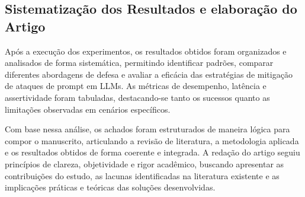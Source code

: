 \subsection{Sistematização dos Resultados e elaboração do Artigo}

Após a execução dos experimentos, os resultados obtidos foram organizados e analisados de forma sistemática, permitindo identificar padrões, comparar diferentes abordagens de defesa e avaliar a eficácia das estratégias de mitigação de ataques de prompt em LLMs. As métricas de desempenho, latência e assertividade foram tabuladas, destacando-se tanto os sucessos quanto as limitações observadas em cenários específicos.

Com base nessa análise, os achados foram estruturados de maneira lógica para compor o manuscrito, articulando a revisão de literatura, a metodologia aplicada e os resultados obtidos de forma coerente e integrada. A redação do artigo seguiu princípios de clareza, objetividade e rigor acadêmico, buscando apresentar as contribuições do estudo, as lacunas identificadas na literatura existente e as implicações práticas e teóricas das soluções desenvolvidas.
